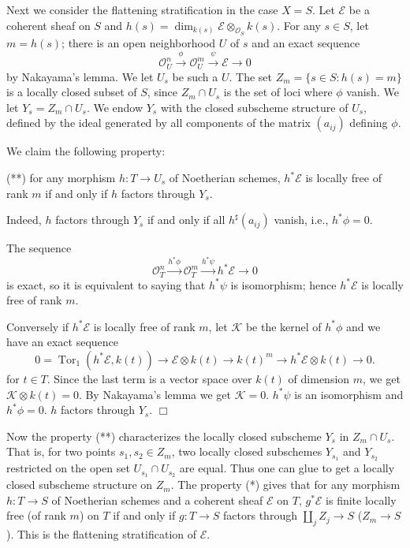 \documentclass{article}
\theoremstyle{theorem}
\begin{document}
    Next we consider the flattening stratification in the case $X = S$. Let $\mathcal E$ be a coherent sheaf on $S$ and $h(s) = \dim_{k(s)} \mathcal E \otimes_{\mathcal O_S} k(s)$. For any $s \in S$, let $m = h(s)$; there is an open neighborhood $U$ of $s$ and an exact sequence
    $$\mathcal O_U^n \xrightarrow{\phi} \mathcal O_U^m \xrightarrow{\psi} \mathcal E \rightarrow 0$$
    by Nakayama's lemma. We let $U_s$ be such a $U$. The set $Z_m = \{ s \in S : h(s) = m \}$ is a locally closed subset of $S$, since $Z_m \cap U_s$ is the set of loci where $\phi$ vanish. We let $Y_s = Z_m \cap U_s$. We endow $Y_s$ with the closed subscheme structure of $U_s$, defined by the ideal generated by all components of the matrix $(a_{ij})$ defining $\phi$.
    
    We claim the following property:
    \newline
    
    (**) for any morphism $h : T \rightarrow U_s$ of Noetherian schemes, $h^*\mathcal E$ is locally free of rank $m$ if and only if $h$ factors through $Y_s$.
    \newline
    
    Indeed, $h$ factors through $Y_s$ if and only if all $h^{\sharp}(a_{ij})$ vanish, i.e., $h^*\phi = 0$.
    
    The sequence
    $$\mathcal O_T^n \xrightarrow{h^*\phi} \mathcal O_T^m \xrightarrow{h^*\psi} h^*\mathcal E \rightarrow 0$$
    is exact, so it is equivalent to saying that $h^*\psi$ is isomorphism; hence $h^*\mathcal E$ is locally free of rank $m$.
    
    Conversely if $h^*\mathcal E$ is locally free of rank $m$, let $\mathcal K$ be the kernel of $h^*\phi$ and we have an exact sequence
    $$ 0 = \operatorname{Tor}_1(h^*\mathcal E, k(t)) \rightarrow \mathcal E \otimes k(t) \rightarrow k(t)^m \rightarrow h^*\mathcal E \otimes k(t) \rightarrow 0.$$
    for $t \in T$. Since the last term is a vector space over $k(t)$ of dimension $m$, we get $\mathcal K \otimes k(t) = 0$. By Nakayama's lemma we get $\mathcal K = 0$. $h^*\psi$ is an isomorphism and $h^*\phi = 0$. $h$ factors through $Y_s$. $\Box$
    \newline
    
    Now the property (**) characterizes the locally closed subscheme $Y_s$ in $Z_m \cap U_s$. That is, for two points $s_1, s_2 \in Z_m$, two locally closed subschemes $Y_{s_1}$ and $Y_{s_2}$ restricted on the open set $U_{s_1} \cap U_{s_2}$ are equal. Thus one can glue to get a locally closed subscheme structure on $Z_m$.  The property (*) gives that for any morphism $h : T \rightarrow S$ of Noetherian schemes and a coherent sheaf $\mathcal E$ on $T$, $g^* \mathcal E$ is finite locally free (of rank $m$) on $T$ if and only if $g : T\rightarrow S$ factors through $\displaystyle \coprod_j Z_j \rightarrow S$ ($Z_m \rightarrow S$). This is the flattening stratification of $\mathcal E$.
    \newline
    
\end{document}
